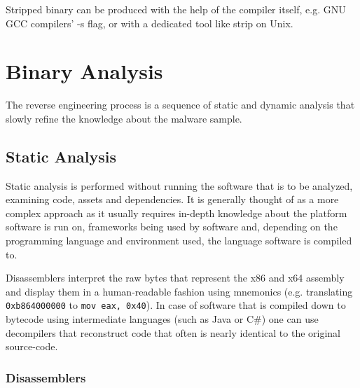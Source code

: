 \documentclass{article}
\begin{document}
Stripped binary can be produced with the help of the compiler itself, e.g. GNU GCC compilers' -s flag, or with 
a dedicated tool like strip on Unix.

\pagebreak
\section{Binary Analysis}

The reverse engineering process is a sequence of static and dynamic analysis that slowly refine the knowledge 
about the malware sample.

\subsection{Static Analysis}

Static analysis is performed without running the software that is to be analyzed, examining code, assets and 
dependencies. It is generally thought of as a more complex approach as it usually requires in-depth knowledge 
about the platform software is run on, frameworks being used by software and, depending on the programming language 
and environment used, the language software is compiled to. 

Disassemblers interpret the raw bytes that represent the x86 and x64 assembly and display them in a human-readable 
fashion using mnemonics (e.g. translating \texttt{0xb864000000} to \texttt{mov eax, 0x40}). In case of software 
that is compiled down to bytecode using intermediate languages (such as Java or C\#) one can use decompilers
that reconstruct code that often is nearly identical to the original source-code.

\subsubsection{Disassemblers}
\end{document}
